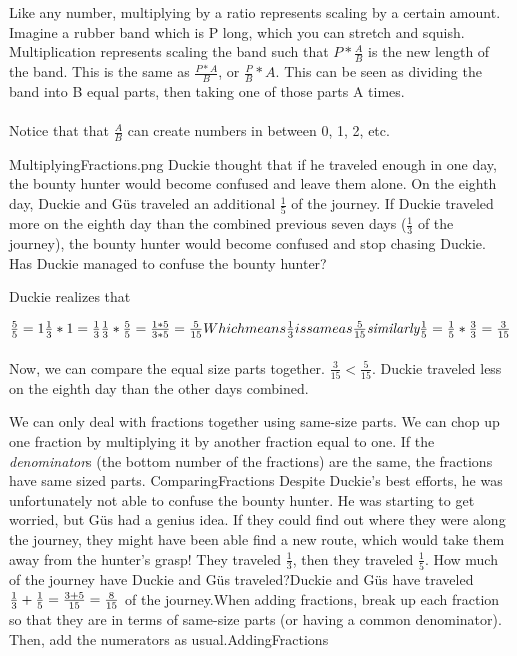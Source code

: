 {Like any number, multiplying by a ratio represents scaling by a certain amount. Imagine a rubber band which is P long, which you can stretch and squish. Multiplication represents scaling the band such that $P*\frac{A}{B}$ is the new length of the band. This is the same as $\frac{P*A}{B}$, or $\frac{P}{B}*A$. This can be seen as dividing the band into B equal parts, then taking one of those parts A times. \paragraph{} Notice that that $\frac{A}{B}$ can create numbers in between 0, 1, 2, etc.}{MultiplyingFractions.png}
{Duckie thought that if he traveled enough in one day, the bounty hunter would become confused and leave them alone. On the eighth day, Duckie and Güs traveled an additional $\frac{1}{5}$ of the journey. If Duckie traveled more on the eighth day than the combined previous seven days ($\frac{1}{3}$ of the journey), the bounty hunter would become confused and stop chasing Duckie. Has Duckie managed to confuse the bounty hunter?}{Duckie realizes that \begin{center}
    $\frac{5}{5}=1 \linebreak
    \frac{1}{3} * 1 = \frac{1}{3} \linebreak
    \frac{1}{3} * \frac{5}{5} = \frac{1*5}{3*5} = \frac{5}{15}\linebreak  Which means \frac{1}{3}  is same as  \frac{5}{15} \linebreak\linebreak
    \textit{similarly}
    \frac{1}{5} = \frac{1}{5} * \frac{3}{3} = \frac{3}{15}$
\end{center}
\paragraph{} Now, we can compare the equal size parts together. $\frac{3}{15} < \frac{5}{15}$. Duckie traveled less on the eighth day than the other days combined.}{We can only deal with fractions together using same-size parts. We can chop up one fraction by multiplying it by another fraction equal to one. If the \textit{denominator}s (the bottom number of the fractions) are the same, the fractions have same sized parts.}
{ComparingFractions}
{Despite Duckie's best efforts, he was unfortunately not able to confuse the bounty hunter. He was starting to get worried, but Güs had a genius idea. If they could find out where they were along the journey, they might have been able find a new route, which would take them away from the hunter's grasp! They traveled $\frac{1}{3}$, then they traveled $\frac{1}{5}$. How much of the journey have Duckie and Güs traveled?}{Duckie and Güs have traveled
$\frac{1}{3}+\frac{1}{5}\linebreak=\frac{3+5}{15}\linebreak=\frac{8}{15}$ of the journey.}{When adding fractions, break up each fraction so that they are in terms of same-size parts (or having a common denominator). Then, add the numerators as usual.}{AddingFractions}
